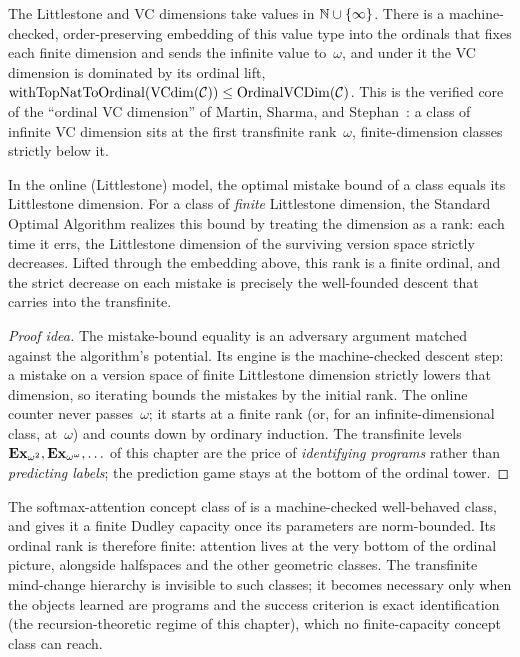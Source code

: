 The Littlestone and VC dimensions take values in $\mathbb{N} \cup \{\infty\}$.
There is a machine-checked, order-preserving embedding of this value type
into the ordinals that fixes each finite dimension and sends the infinite
value to~$\omega$, and under
it the VC dimension is dominated by its ordinal lift,
$\mathrm{withTopNatToOrdinal}(\mathrm{VCdim}(\mathcal{C})) \leq
\mathrm{OrdinalVCDim}(\mathcal{C})$.
This is the verified core of the ``ordinal VC dimension'' of Martin,
Sharma, and Stephan~\cite{MartinSharmaStephan2006}: a class of infinite VC
dimension sits at the first transfinite rank~$\omega$, finite-dimension
classes strictly below it.

\begin{prop}
\label{prop:online-ordinal-descent}
In the online (Littlestone) model, the optimal mistake bound of a class
equals its Littlestone dimension.
For a class of \emph{finite} Littlestone dimension, the Standard Optimal
Algorithm realizes this bound by treating the dimension as a rank: each
time it errs, the Littlestone dimension of the surviving version space
strictly decreases.  Lifted through the embedding above, this rank is a
finite ordinal, and the strict decrease on each mistake is precisely the
well-founded descent that  carries into the
transfinite.
\end{prop}

\begin{proof}[Proof idea]
The mistake-bound equality is an adversary argument matched against the
algorithm's potential.  Its engine is the machine-checked descent step:
a mistake on a version space of finite Littlestone dimension strictly
lowers that dimension, so iterating bounds the mistakes by the initial
rank.  The online counter never passes~$\omega$; it starts at a finite
rank (or, for an infinite-dimensional class, at~$\omega$) and counts down
by ordinary induction.  The transfinite levels $\mathbf{Ex}_{\omega^2},
\mathbf{Ex}_{\omega^\omega}, \ldots$ of this chapter are the price of
\emph{identifying programs} rather than \emph{predicting labels}; the
prediction game stays at the bottom of the ordinal tower.
\end{proof}

\begin{remark}
\label{rem:attention-ordinal}
The softmax-attention concept class of  is a
machine-checked well-behaved class,
and  gives it a finite Dudley capacity once
its parameters are norm-bounded.  Its ordinal rank is therefore finite:
attention lives at the very bottom of the ordinal picture, alongside
halfspaces and the other geometric classes.  The transfinite mind-change
hierarchy is invisible to such classes; it becomes necessary only when
the objects learned are programs and the success criterion is exact
identification (the recursion-theoretic regime of this chapter), which no
finite-capacity concept class can reach.
\end{remark}


